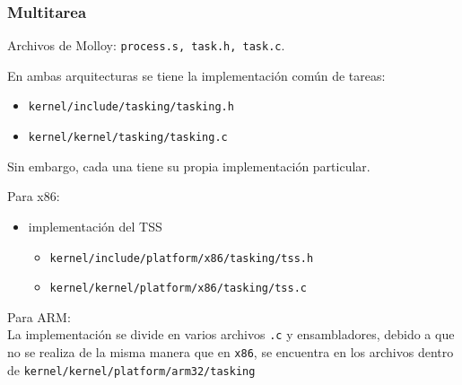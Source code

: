 	
	\subsubsection{Multitarea}
		Archivos de Molloy: \texttt{process.s, task.h, task.c}.
		
		En ambas arquitecturas se tiene la implementación común de tareas:
		\begin{itemize} \setlength\itemsep{0pt}
			\item \texttt{kernel/include/tasking/tasking.h}
			\item \texttt{kernel/kernel/tasking/tasking.c}
		\end{itemize}
	
		Sin embargo, cada una tiene su propia implementación particular.
		
		Para x86:
		\begin{itemize} \setlength\itemsep{0pt}
			\item implementación del TSS
			\begin{itemize} \setlength\itemsep{0pt}
				\item \texttt{kernel/include/platform/x86/tasking/tss.h}
				\item \texttt{kernel/kernel/platform/x86/tasking/tss.c}
			\end{itemize}
		\end{itemize}
		
		Para ARM:\\
		La implementación se divide en varios archivos \texttt{.c} y ensambladores, debido a que no se realiza de la misma manera que en \texttt{x86}, se encuentra en los archivos dentro de
		\texttt{kernel/kernel/platform/arm32/tasking}
		
